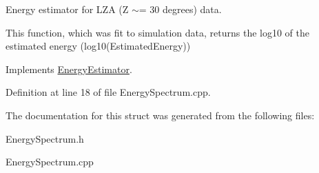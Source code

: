 Energy estimator for LZA (Z $\sim$= 30 degrees) data. 

This function, which was fit to simulation data, returns the log10 of the estimated energy (log10(EstimatedEnergy)) 

Implements \hyperlink{structEnergyEstimator}{EnergyEstimator}.



Definition at line 18 of file EnergySpectrum.cpp.



The documentation for this struct was generated from the following files:\begin{DoxyCompactItemize}
\item 
EnergySpectrum.h\item 
EnergySpectrum.cpp\end{DoxyCompactItemize}
